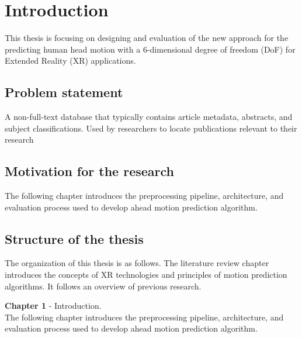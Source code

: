 \chapter{Introduction}
\label{sec:intro}
This thesis is focusing on designing and evaluation of the new approach for the predicting human head motion with a 6-dimensional degree of freedom (DoF) for Extended Reality (XR) applications. 


\section{Problem statement}
\label{sec:intro:problem}
A non-full-text database that typically contains article metadata, abstracts, and subject classifications. Used by researchers to locate publications relevant to their research

\section{Motivation for the research}
\label{sec:intro:motivation}
The following chapter introduces the preprocessing pipeline, architecture, and evaluation process used to develop ahead motion prediction algorithm.


\section{Structure of the thesis}
\label{sec:intro:structure}
The organization of this thesis is as follows. The literature review chapter introduces the concepts of XR technologies and principles of motion prediction algorithms. It follows an overview of previous research. 

\textbf{Chapter 1} - Introduction.\\
The following chapter introduces the preprocessing pipeline, architecture, and evaluation process used to develop ahead motion prediction algorithm.




